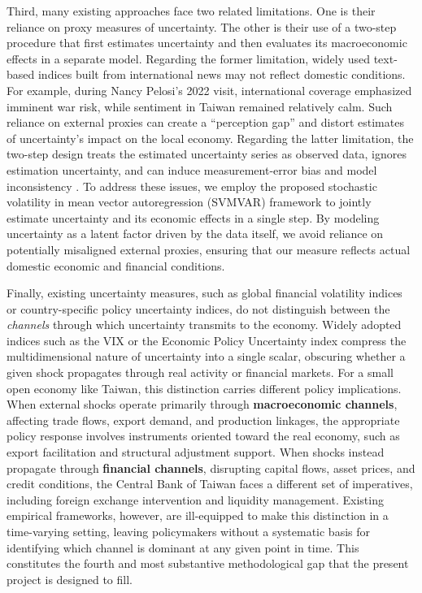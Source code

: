Third, many existing approaches face two related limitations. One is their reliance on proxy measures of uncertainty. The other is their use of a two-step procedure that first estimates uncertainty and then evaluates its macroeconomic effects in a separate model. Regarding the former limitation, widely used text-based indices built from international news may not reflect domestic conditions. For example, during Nancy Pelosi's 2022 visit, international coverage emphasized imminent war risk, while sentiment in Taiwan remained relatively calm. Such reliance on external proxies can create a ``perception gap'' and distort estimates of uncertainty's impact on the local economy. Regarding the latter limitation, the two-step design treats the estimated uncertainty series as observed data, ignores estimation uncertainty, and can induce measurement-error bias and model inconsistency \citep{carriero2018measuring}. To address these issues, we employ the proposed stochastic volatility in mean vector autoregression (SVMVAR) framework to jointly estimate uncertainty and its economic effects in a single step. By modeling uncertainty as a latent factor driven by the data itself, we avoid reliance on potentially misaligned external proxies, ensuring that our measure reflects actual domestic economic and financial conditions.

Finally, existing uncertainty measures, such as global financial volatility indices or country-specific policy uncertainty indices, do not distinguish between the \textit{channels} through which uncertainty transmits to the economy. Widely adopted indices such as the VIX or the \citet{baker2016measuring} Economic Policy Uncertainty index compress the multidimensional nature of uncertainty into a single scalar, obscuring whether a given shock propagates through real activity or financial markets. For a small open economy like Taiwan, this distinction carries different policy implications. When external shocks operate primarily through \textbf{macroeconomic channels}, affecting trade flows, export demand, and production linkages, the appropriate policy response involves instruments oriented toward the real economy, such as export facilitation and structural adjustment support. When shocks instead propagate through \textbf{financial channels}, disrupting capital flows, asset prices, and credit conditions, the Central Bank of Taiwan faces a different set of imperatives, including foreign exchange intervention and liquidity management. Existing empirical frameworks, however, are ill-equipped to make this distinction in a time-varying setting, leaving policymakers without a systematic basis for identifying which channel is dominant at any given point in time. This constitutes the fourth and most substantive methodological gap that the present project is designed to fill.

